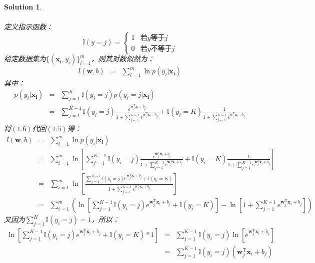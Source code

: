 \documentclass[a4paper,UTF8]{article}
\numberwithin{equation}{section}
\newtheorem*{solution}{Solution}
\begin{document}
\begin{solution}
\begin{enumerate}
\begin{eqnarray}
		\end{eqnarray}
		定义指示函数：
		$$\mathbb{I}(y=j)=
		\begin{cases}
		1& \text{若$y$等于$j$}\\
		0& \text{若$y$不等于$j$}
		\end{cases}$$
		给定数据集为$\{(\mathbf{x_i}, y_i)\}_{i=1}^m$，则其对数似然为：
		\begin{eqnarray}
			l(\mathbf{w}, b) &=& \sum_{i=1}^m\ln p(y_i|\mathbf{x_i})
		\end{eqnarray}
		其中：
		\begin{eqnarray}
			p(y_i|\mathbf{x_i})&=&\sum_{j=1}^K\mathbb{I}(y_i=j)p(y_i=j|\mathbf{x_i})\\
			&=&\sum_{j=1}^{K-1}\mathbb{I}(y_i = j)\frac{e^{\mathbf{w}_j^\mathrm{T}\mathbf{x}_i+b_j}}{1+\sum_{j=1}^{K-1}e^{\mathbf{w}_j^\mathrm{T}\mathbf{x}_i+b_j}}+\mathbb{I}(y_i = K)\frac{1}{1+\sum_{j=1}^{K-1}e^{\mathbf{w}_j^\mathrm{T}\mathbf{x}_i+b_j}}\nonumber
		\end{eqnarray}
		将$(1.6)$代回$(1.5)$得：
		\begin{eqnarray}
			l(\mathbf{w}, b) &=& \sum_{i=1}^m\ln p(y_i|\mathbf{x_i})\\
			&=&\sum_{i=1}^m\ln[\sum_{j=1}^{K-1}\mathbb{I}(y_i=j)\frac{e^{\mathbf{w}_j^\mathrm{T}\mathbf{x}_i+b_j}}{1+\sum_{j=1}^{K-1}e^{\mathbf{w}_j^\mathrm{T}\mathbf{x}_i+b_j}}+\mathbb{I}(y_i=K)\frac{1}{1+\sum_{j=1}^{K-1}e^{\mathbf{w}_j^\mathrm{T}\mathbf{x}_i+b_j}}]\nonumber\\
			&=&\sum_{i=1}^m\ln[\frac{\sum_{j=1}^{K-1}\mathbb{I}(y_i=j)e^{\mathbf{w}_j^\mathrm{T}\mathbf{x}_i+b_j}+\mathbb{I}(y_i=K)}{1+\sum_{j=1}^{K-1}e^{\mathbf{w}_j^\mathrm{T}\mathbf{x}_i+b_j}}]\nonumber\\
			&=&\sum_{i=1}^m(\ln[\sum_{j=1}^{K-1}\mathbb{I}(y_i=j)e^{\mathbf{w}_j^\mathrm{T}\mathbf{x}_i+b_j}+\mathbb{I}(y_i=K)]-\ln[1+\sum_{j=1}^{K-1}e^{\mathbf{w}_j^\mathrm{T}\mathbf{x}_i+b_j}])\nonumber
		\end{eqnarray}
		又因为$\sum_{j=1}^K\mathbb{I}(y_i=j)=1$，所以：
		\begin{eqnarray}
			\ln[\sum_{j=1}^{K-1}\mathbb{I}(y_i=j)e^{\mathbf{w}_j^\mathrm{T}\mathbf{x}_i+b_j}+\mathbb{I}(y_i=K)*1]&=&\sum_{j=1}^{K-1}\mathbb{I}(y_i=j)\ln[e^{\mathbf{w}_j^\mathrm{T}\mathbf{x}_i+b_j}]\\
			&=&\sum_{j=1}^{K-1}\mathbb{I}(y_i=j)(\mathbf{w}_j^\mathrm{T}\mathbf{x}_i+b_j)\nonumber
		\end{eqnarray}

\end{enumerate}
\end{solution}
\end{document}
